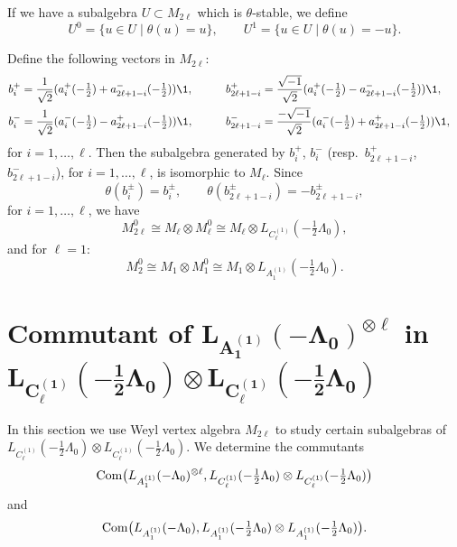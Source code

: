 If we have a subalgebra $U \subset M_{2 \ell}$ which is
$\theta$-stable, we def\/ine
\[
U ^0 = \{ u \in U \; \vert \; \theta (u) = u \}, \qquad U ^1 = \{ u
\in U \; \vert \; \theta (u) = -u \}.
\]

Def\/ine the following vectors in $M_{2 \ell}$:
\begin{alignat*}{3}
&b_{i} ^+ = \frac{1}{\sqrt{2}}( a_{i} ^+ (-\tfrac{1}{2}) +
a_{2\ell+1-i} ^- (-\tfrac{1}{2}) ) {\1},\qquad
&& b_{2\ell+1-i} ^+ = \frac{\sqrt{-1}}{\sqrt{2}}( a_{i} ^+ (-\tfrac{1}{2}) - a_{2\ell+1-i} ^- (-\tfrac{1}{2}) ) {\1}, &  \\
& b_{i} ^- = \frac{1}{\sqrt{2}}( a_{i} ^- (-\tfrac{1}{2}) -
a_{2\ell+1-i}^+ (-\tfrac{1}{2}) ) {\1}, \qquad &&b_{2\ell+1-i} ^- =
\frac{-\sqrt{-1}}{\sqrt{2}}( a_{i} ^- (-\tfrac{1}{2}) +
a_{2\ell+1-i} ^+ (-\tfrac{1}{2}) ) {\1}, &
\end{alignat*} for $i =1, \dots, \ell$. Then the subalgebra generated by $b_i
^+$, $b _i ^-$ (resp.\ $b_{2\ell+1-i} ^+$, $b _{2\ell+1-i} ^-$), for $i
=1, \dots, \ell$, is isomorphic to $M_{\ell}$.
Since
\[ \theta (b_i ^{\pm}) = b_i ^{\pm}, \qquad  \theta (b_{2\ell+1-i}
^{\pm}) = - b_{2\ell+1-i} ^{\pm},\]
for $i =1, \dots, \ell$, we have \[ M_{2 \ell}^{0} \cong M_{\ell}
\otimes M_{\ell} ^0 \cong M_{\ell} \otimes L_{C_{\ell} ^{(1)}}(
-\tfrac{1}{2}\Lambda _{0}),\] and for $\ell =1$: \[ M_{2}^{0} \cong
M_{1} \otimes M_{1} ^0 \cong M_{1} \otimes L_{A_1 ^{(1)}}(
-\tfrac{1}{2}\Lambda _{0}).\]




\section[Commutant of $L_{A_1 ^{(1)}}(- \Lambda_0) ^{\otimes \ell}$ in  $L_{C_{\ell} ^{(1)}}(-\frac{1}{2}\Lambda_0)
\otimes L_{C_{\ell} ^{(1)}}(-\frac{1}{2}\Lambda_0)$]{Commutant of $\boldsymbol{L_{A_1 ^{(1)}}(- \Lambda_0) ^{\otimes \ell}}$ in  $\boldsymbol{L_{C_{\ell} ^{(1)}}(-\frac{1}{2}\Lambda_0)
\otimes L_{C_{\ell} ^{(1)}}(-\frac{1}{2}\Lambda_0)}$}

In this section we use Weyl vertex algebra $M_{2 \ell}$ to study
certain subalgebras of $L_{C_{\ell} ^{(1)}}(-\tfrac{1}{2}\Lambda_0)
\otimes L_{C_{\ell} ^{(1)}}(-\tfrac{1}{2}\Lambda_0)$. We determine
the commutants
\[
{\rm Com} \big( L_{A_1 ^{(1)}}(- \Lambda_0) ^{\otimes
\ell},L_{C_{\ell} ^{(1)}}(-\tfrac{1}{2}\Lambda_0) \otimes
L_{C_{\ell} ^{(1)}}(-\tfrac{1}{2}\Lambda_0)\big)
\]
and \[
{\rm Com} \big( L_{A_1 ^{(1)}}(-\Lambda_0),L_{A_1
^{(1)}}(-\tfrac{1}{2}\Lambda_0) \otimes L_{A_1
^{(1)}}(-\tfrac{1}{2}\Lambda_0) \big).
\]



